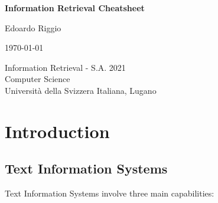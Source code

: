 \documentclass{article}
\begin{document}
\begin{titlepage}
    \begin{center}
        \vspace*{1cm}
        
        \Huge
        \textbf{Information Retrieval Cheatsheet}
        
        \vspace{0.5cm}
        \LARGE
        
        \vspace{.5cm}
        
        Edoardo Riggio
   		  \vspace{1.5cm}
       
        \vfill
        
        \today
        
        \vspace{.8cm}
          \Large
          Information Retrieval - S.A. 2021 \\
        Computer Science\\
        Universit\`{a} della Svizzera Italiana, Lugano\\
        
    \end{center}
\end{titlepage}

\tableofcontents

\newpage

\section{Introduction}
\subsection{Text Information Systems}
Text Information Systems involve three main capabilities:
\end{document}
